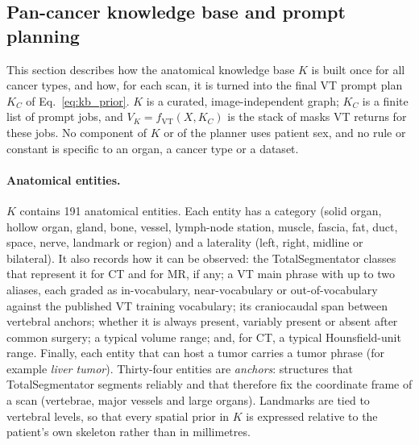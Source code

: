 \documentclass[fleqn,10pt]{olplainarticle}
\begin{document}
\subsection{Pan-cancer knowledge base and prompt planning}
\label{sec:kb_planning}

This section describes how the anatomical knowledge base $K$ is built once for all cancer types, and how, for each scan,
it is turned into the final VT prompt plan $K_C$ of Eq.~\eqref{eq:kb_prior}. $K$ is a curated, image-independent graph;
$K_C$ is a finite list of prompt jobs, and $V_K=f_{\mathrm{VT}}(X,K_C)$ is the stack of masks VT returns for these jobs.
No component of $K$ or of the planner uses patient sex, and no rule or constant is specific to an organ, a cancer type
or a dataset.

\paragraph{Anatomical entities.}
$K$ contains 191 anatomical entities. Each entity has a category (solid organ, hollow organ, gland, bone, vessel,
lymph-node station, muscle, fascia, fat, duct, space, nerve, landmark or region) and a laterality (left, right, midline
or bilateral). It also records how it can be observed: the TotalSegmentator classes that represent it for CT and for
MR, if any; a VT main phrase with up to two aliases, each graded as in-vocabulary, near-vocabulary or
out-of-vocabulary against the published VT training vocabulary; its craniocaudal span between vertebral anchors;
whether it is always present, variably present or absent after common surgery; a typical volume range; and, for CT, a
typical Hounsfield-unit range. Finally, each entity that can host a tumor carries a tumor phrase (for example
\emph{liver tumor}). Thirty-four entities are \emph{anchors}: structures that TotalSegmentator segments reliably and
that therefore fix the coordinate frame of a scan (vertebrae, major vessels and large organs). Landmarks are tied to
vertebral levels, so that every spatial prior in $K$ is expressed relative to the patient's own skeleton rather than in
millimetres.
\end{document}
